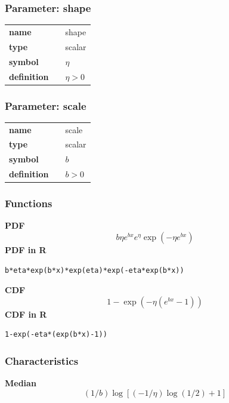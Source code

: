 \subsubsection*{Parameter: shape}

\noindent\begin{tabular}{p{2cm}cl}
\textbf{name} & & shape \\
\textbf{type} & & scalar \\
\textbf{symbol} & & $\eta$  \\
\textbf{definition} & & $\eta > 0$
\end{tabular}
\subsubsection*{Parameter: scale}

\noindent\begin{tabular}{p{2cm}cl}
\textbf{name} & & scale \\
\textbf{type} & & scalar \\
\textbf{symbol} & & $b$  \\
\textbf{definition} & & $b > 0$
\end{tabular}
\subsubsection*{Functions}

\smallskip \noindent \hspace{.2cm} \textbf{PDF} 
\begin{equation*}b\eta e^{bx}e^{\eta}\exp\left(-\eta e^{bx} \right)\end{equation*}
\smallskip \noindent \hspace{.2cm} \textbf{PDF in R}  
\begin{verbatim}b*eta*exp(b*x)*exp(eta)*exp(-eta*exp(b*x))\end{verbatim}
\smallskip \noindent \hspace{.2cm} \textbf{CDF} 
\begin{equation*}1-\exp\left(-\eta\left(e^{bx}-1 \right)\right)\end{equation*}
\smallskip \noindent \hspace{.2cm} \textbf{CDF in R} 
\begin{verbatim}1-exp(-eta*(exp(b*x)-1))\end{verbatim}
\smallskip
\subsubsection*{Characteristics}
\smallskip \noindent \hspace{.2cm} \textbf{Median} 
\begin{equation*}\left(1/b\right)\log\left[\left(-1/\eta\right) \log\left(1/2\right)+1\right]\end{equation*}
\smallskip
